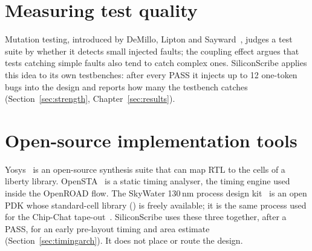 \section{Measuring test quality}
Mutation testing, introduced by DeMillo, Lipton and Sayward~\cite{demillo}, judges a test suite by whether it detects small injected faults; the coupling effect argues that tests catching simple faults also tend to catch complex ones. SiliconScribe applies this idea to its own testbenches: after every PASS it injects up to 12 one-token bugs into the design and reports how many the testbench catches (Section~\ref{sec:strength}, Chapter~\ref{sec:results}).

\section{Open-source implementation tools}
Yosys~\cite{yosys} is an open-source synthesis suite that can map RTL to the cells of a liberty library. OpenSTA~\cite{opensta} is a static timing analyser, the timing engine used inside the OpenROAD flow. The SkyWater 130\,nm process design kit~\cite{sky130} is an open PDK whose standard-cell library () is freely available; it is the same process used for the Chip-Chat tape-out~\cite{chipchat}. SiliconScribe uses these three together, after a PASS, for an early pre-layout timing and area estimate (Section~\ref{sec:timingarch}). It does not place or route the design.

